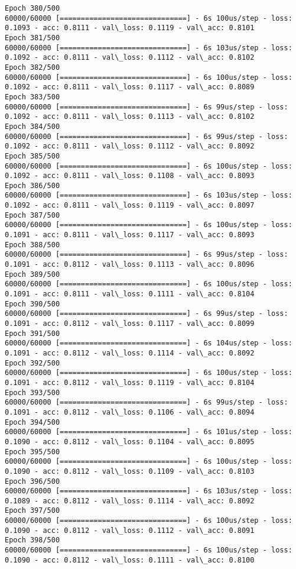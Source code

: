 \documentclass[11pt]{article}
\begin{document}
\begin{Verbatim}[commandchars=\\\{\}]
Epoch 380/500
60000/60000 [==============================] - 6s 100us/step - loss: 0.1093 - acc: 0.8111 - val\_loss: 0.1119 - val\_acc: 0.8101
Epoch 381/500
60000/60000 [==============================] - 6s 103us/step - loss: 0.1092 - acc: 0.8111 - val\_loss: 0.1112 - val\_acc: 0.8102
Epoch 382/500
60000/60000 [==============================] - 6s 100us/step - loss: 0.1092 - acc: 0.8111 - val\_loss: 0.1117 - val\_acc: 0.8089
Epoch 383/500
60000/60000 [==============================] - 6s 99us/step - loss: 0.1092 - acc: 0.8111 - val\_loss: 0.1113 - val\_acc: 0.8102
Epoch 384/500
60000/60000 [==============================] - 6s 99us/step - loss: 0.1092 - acc: 0.8111 - val\_loss: 0.1112 - val\_acc: 0.8092
Epoch 385/500
60000/60000 [==============================] - 6s 100us/step - loss: 0.1092 - acc: 0.8111 - val\_loss: 0.1108 - val\_acc: 0.8093
Epoch 386/500
60000/60000 [==============================] - 6s 103us/step - loss: 0.1092 - acc: 0.8111 - val\_loss: 0.1119 - val\_acc: 0.8097
Epoch 387/500
60000/60000 [==============================] - 6s 100us/step - loss: 0.1091 - acc: 0.8111 - val\_loss: 0.1117 - val\_acc: 0.8093
Epoch 388/500
60000/60000 [==============================] - 6s 99us/step - loss: 0.1091 - acc: 0.8112 - val\_loss: 0.1113 - val\_acc: 0.8096
Epoch 389/500
60000/60000 [==============================] - 6s 100us/step - loss: 0.1091 - acc: 0.8111 - val\_loss: 0.1111 - val\_acc: 0.8104
Epoch 390/500
60000/60000 [==============================] - 6s 99us/step - loss: 0.1091 - acc: 0.8112 - val\_loss: 0.1117 - val\_acc: 0.8099
Epoch 391/500
60000/60000 [==============================] - 6s 104us/step - loss: 0.1091 - acc: 0.8112 - val\_loss: 0.1114 - val\_acc: 0.8092
Epoch 392/500
60000/60000 [==============================] - 6s 100us/step - loss: 0.1091 - acc: 0.8112 - val\_loss: 0.1119 - val\_acc: 0.8104
Epoch 393/500
60000/60000 [==============================] - 6s 99us/step - loss: 0.1091 - acc: 0.8112 - val\_loss: 0.1106 - val\_acc: 0.8094
Epoch 394/500
60000/60000 [==============================] - 6s 101us/step - loss: 0.1090 - acc: 0.8112 - val\_loss: 0.1104 - val\_acc: 0.8095
Epoch 395/500
60000/60000 [==============================] - 6s 100us/step - loss: 0.1090 - acc: 0.8112 - val\_loss: 0.1109 - val\_acc: 0.8103
Epoch 396/500
60000/60000 [==============================] - 6s 103us/step - loss: 0.1089 - acc: 0.8112 - val\_loss: 0.1114 - val\_acc: 0.8092
Epoch 397/500
60000/60000 [==============================] - 6s 100us/step - loss: 0.1090 - acc: 0.8112 - val\_loss: 0.1112 - val\_acc: 0.8091
Epoch 398/500
60000/60000 [==============================] - 6s 100us/step - loss: 0.1090 - acc: 0.8112 - val\_loss: 0.1111 - val\_acc: 0.8100

\end{Verbatim}
\end{document}
